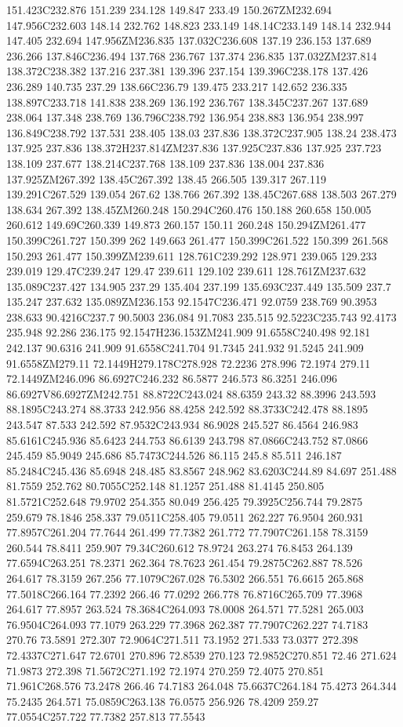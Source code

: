 151.423C232.876 151.239 234.128 149.847 233.49 150.267ZM232.694 147.956C232.603 148.14 232.762 148.823 233.149 148.14C233.149 148.14 232.944 147.405 232.694 147.956ZM236.835 137.032C236.608 137.19 236.153 137.689 236.266 137.846C236.494 137.768 236.767 137.374 236.835 137.032ZM237.814 138.372C238.382 137.216 237.381 139.396 237.154 139.396C238.178 137.426 236.289 140.735 237.29 138.66C236.79 139.475 233.217 142.652 236.335 138.897C233.718 141.838 238.269 136.192 236.767 138.345C237.267 137.689 238.064 137.348 238.769 136.796C238.792 136.954 238.883 136.954 238.997 136.849C238.792 137.531 238.405 138.03 237.836 138.372C237.905 138.24 238.473 137.925 237.836 138.372H237.814ZM237.836 137.925C237.836 137.925 237.723 138.109 237.677 138.214C237.768 138.109 237.836 138.004 237.836 137.925ZM267.392 138.45C267.392 138.45 266.505 139.317 267.119 139.291C267.529 139.054 267.62 138.766 267.392 138.45C267.688 138.503 267.279 138.634 267.392 138.45ZM260.248 150.294C260.476 150.188 260.658 150.005 260.612 149.69C260.339 149.873 260.157 150.11 260.248 150.294ZM261.477 150.399C261.727 150.399 262 149.663 261.477 150.399C261.522 150.399 261.568 150.293 261.477 150.399ZM239.611 128.761C239.292 128.971 239.065 129.233 239.019 129.47C239.247 129.47 239.611 129.102 239.611 128.761ZM237.632 135.089C237.427 134.905 237.29 135.404 237.199 135.693C237.449 135.509 237.7 135.247 237.632 135.089ZM236.153 92.1547C236.471 92.0759 238.769 90.3953 238.633 90.4216C237.7 90.5003 236.084 91.7083 235.515 92.5223C235.743 92.4173 235.948 92.286 236.175 92.1547H236.153ZM241.909 91.6558C240.498 92.181 242.137 90.6316 241.909 91.6558C241.704 91.7345 241.932 91.5245 241.909 91.6558ZM279.11 72.1449H279.178C278.928 72.2236 278.996 72.1974 279.11 72.1449ZM246.096 86.6927C246.232 86.5877 246.573 86.3251 246.096 86.6927V86.6927ZM242.751 88.8722C243.024 88.6359 243.32 88.3996 243.593 88.1895C243.274 88.3733 242.956 88.4258 242.592 88.3733C242.478 88.1895 243.547 87.533 242.592 87.9532C243.934 86.9028 245.527 86.4564 246.983 85.6161C245.936 85.6423 244.753 86.6139 243.798 87.0866C243.752 87.0866 245.459 85.9049 245.686 85.7473C244.526 86.115 245.8 85.511 246.187 85.2484C245.436 85.6948 248.485 83.8567 248.962 83.6203C244.89 84.697 251.488 81.7559 252.762 80.7055C252.148 81.1257 251.488 81.4145 250.805 81.5721C252.648 79.9702 254.355 80.049 256.425 79.3925C256.744 79.2875 259.679 78.1846 258.337 79.0511C258.405 79.0511 262.227 76.9504 260.931 77.8957C261.204 77.7644 261.499 77.7382 261.772 77.7907C261.158 78.3159 260.544 78.8411 259.907 79.34C260.612 78.9724 263.274 76.8453 264.139 77.6594C263.251 78.2371 262.364 78.7623 261.454 79.2875C262.887 78.526 264.617 78.3159 267.256 77.1079C267.028 76.5302 266.551 76.6615 265.868 77.5018C266.164 77.2392 266.46 77.0292 266.778 76.8716C265.709 77.3968 264.617 77.8957 263.524 78.3684C264.093 78.0008 264.571 77.5281 265.003 76.9504C264.093 77.1079 263.229 77.3968 262.387 77.7907C262.227 74.7183 270.76 73.5891 272.307 72.9064C271.511 73.1952 271.533 73.0377 272.398 72.4337C271.647 72.6701 270.896 72.8539 270.123 72.9852C270.851 72.46 271.624 71.9873 272.398 71.5672C271.192 72.1974 270.259 72.4075 270.851 71.961C268.576 73.2478 266.46 74.7183 264.048 75.6637C264.184 75.4273 264.344 75.2435 264.571 75.0859C263.138 76.0575 256.926 78.4209 259.27 77.0554C257.722 77.7382 257.813 77.5543 